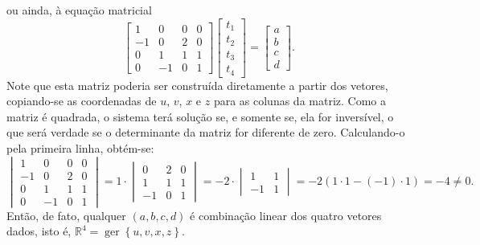 \documentclass[12pt,a4paper]{article}
\newcommand*\ger[1]{\operatorname{ger}\left\{#1\right\}}
\newcommand*\R{\mathbb{R}}
\begin{document}
\begin{enumerate}
ou ainda, à equação matricial
\[
\begin{bmatrix}
 1 &  0 & 0 & 0 \\
-1 &  0 & 2 & 0 \\
 0 &  1 & 1 & 1 \\
 0 & -1 & 0 & 1
\end{bmatrix}
\begin{bmatrix}
t_1 \\
t_2 \\
t_3 \\
t_4
\end{bmatrix}
=
\begin{bmatrix}
a \\
b \\
c \\
d
\end{bmatrix}.
\]
Note que esta matriz poderia ser construída diretamente a partir dos vetores, copiando-se as coordenadas de $u$, $v$, $x$ e $z$ para as colunas da matriz. Como a matriz é quadrada, o sistema terá solução se, e somente se, ela for inversível, o que será verdade se o determinante da matriz for diferente de zero. Calculando-o pela primeira linha, obtém-se:
\[
\begin{vmatrix}
 1 &  0 & 0 & 0 \\
-1 &  0 & 2 & 0 \\
 0 &  1 & 1 & 1 \\
 0 & -1 & 0 & 1
\end{vmatrix}
=
1 \cdot
\begin{vmatrix}
 0 & 2 & 0 \\
 1 & 1 & 1 \\
-1 & 0 & 1
\end{vmatrix}
=
-2 \cdot
\begin{vmatrix}
 1 & 1 \\
-1 & 1
\end{vmatrix}
= -2(1 \cdot 1 - (-1) \cdot 1)
=-4 \neq 0.
\]
Então, de fato, qualquer $(a,b,c,d)$ é combinação linear dos quatro vetores dados, isto é, $\R^4 = \ger{u,v,x,z}$.


\end{enumerate}
\end{document}
